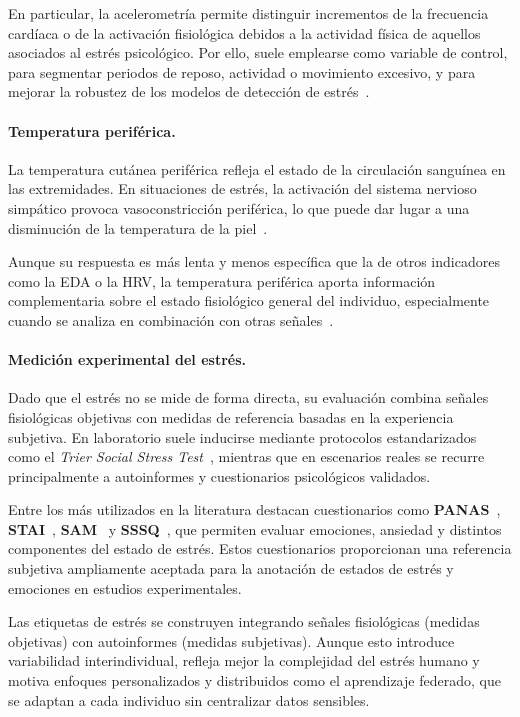 \documentclass{report}
\begin{document}
En particular, la acelerometría permite distinguir incrementos de la frecuencia cardíaca o de la activación fisiológica debidos a la actividad física de aquellos asociados al estrés psicológico.  
Por ello, suele emplearse como variable de control, para segmentar periodos de reposo, actividad o movimiento excesivo, y para mejorar la robustez de los modelos de detección de estrés~\cite{Giakoumis2012}.

\paragraph{Temperatura periférica.}
La temperatura cutánea periférica refleja el estado de la circulación sanguínea en las extremidades.  
En situaciones de estrés, la activación del sistema nervioso simpático provoca vasoconstricción periférica, lo que puede dar lugar a una disminución de la temperatura de la piel~\cite{Herborn2015}.

Aunque su respuesta es más lenta y menos específica que la de otros indicadores como la EDA o la HRV, la temperatura periférica aporta información complementaria sobre el estado fisiológico general del individuo, especialmente cuando se analiza en combinación con otras señales~\cite{Herborn2015}.

\paragraph{Medición experimental del estrés.}
Dado que el estrés no se mide de forma directa, su evaluación combina señales fisiológicas objetivas con medidas de referencia basadas en la experiencia subjetiva. En laboratorio suele inducirse mediante protocolos estandarizados como el \textit{Trier Social Stress Test}~\cite{Kirschbaum1993}, mientras que en escenarios reales se recurre principalmente a autoinformes y cuestionarios psicológicos validados.

Entre los más utilizados en la literatura destacan cuestionarios como \textbf{PANAS}~\cite{Watson1988}, \textbf{STAI}~\cite{Spielberger1983}, \textbf{SAM}~\cite{Bradley1994} y \textbf{SSSQ}~\cite{Helton2004}, que permiten evaluar emociones, ansiedad y distintos componentes del estado de estrés.  
Estos cuestionarios proporcionan una referencia subjetiva ampliamente aceptada para la anotación de estados de estrés y emociones en estudios experimentales.

Las etiquetas de estrés se construyen integrando señales fisiológicas (medidas objetivas) con autoinformes (medidas subjetivas). Aunque esto introduce variabilidad interindividual, refleja mejor la complejidad del estrés humano y motiva enfoques personalizados y distribuidos como el aprendizaje federado, que se adaptan a cada individuo sin centralizar datos sensibles.
\end{document}

